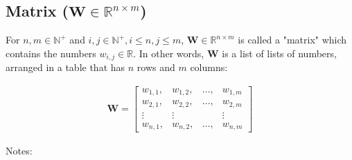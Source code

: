 \documentclass[titlepage]{article}
\begin{document}
      \subsection{Matrix ($\mathbf{W} \in \mathbb{R}^{n \times m}$)}

        For $n, m \in \mathbb{N}^+$ and
        $i, j \in \mathbb{N}^+, i \leq n, j \leq m$,
        $\mathbf{W} \in \mathbb{R}^{n \times m}$ is called a "matrix" which
        contains the numbers $w_{i, j} \in \mathbb{R}$. In other words,
        $\mathbf{W}$ is a list of lists of numbers, arranged in a table that has
        $n$ rows and $m$ columns:

        \begin{align*}
          \mathbf{W}
            = \begin{bmatrix}
                w_{1,1}, & w_{1,2}, & \ldots, & w_{1,m} \\
                w_{2,1}, & w_{2,2}, & \ldots, & w_{2,m} \\
                \vdots & \vdots & & \vdots \\
                w_{n,1}, & w_{n,2}, & \ldots, & w_{n,m}
              \end{bmatrix}
        \end{align*}

        Notes:
\end{document}
